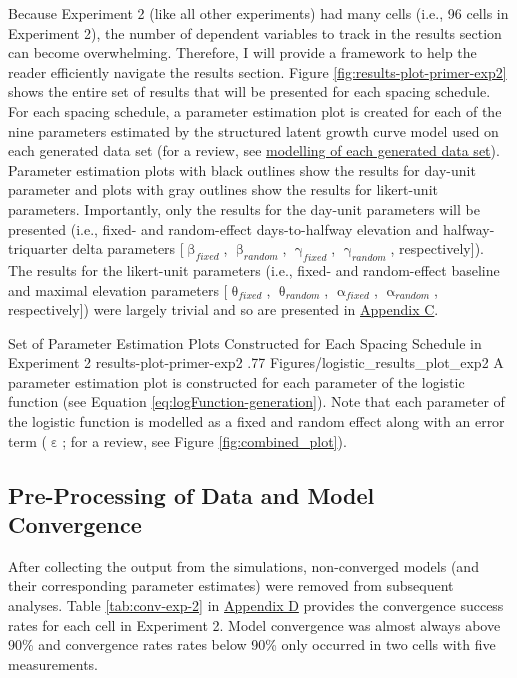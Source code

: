 \documentclass[
12pt, %
twoside,
english]{guelphthesis}
\theoremstyle{definition}
\theoremstyle{definition}
\theoremstyle{definition}
\theoremstyle{definition}
\theoremstyle{remark}
\begin{document}
Because Experiment 2 (like all other experiments) had many cells (i.e., 96 cells in Experiment 2), the number of dependent variables to track in the results section can become overwhelming. Therefore, I will provide a framework to help the reader efficiently navigate the results section. Figure \ref{fig:results-plot-primer-exp2} shows the entire set of results that will be presented for each spacing schedule. For each spacing schedule, a parameter estimation plot is created for each of the nine parameters estimated by the structured latent growth curve model used on each generated data set (for a review, see \protect\hyperlink{modelling-data-sets}{modelling of each generated data set}). Parameter estimation plots with black outlines show the results for day-unit parameter and plots with gray outlines show the results for likert-unit parameters. Importantly, only the results for the day-unit parameters will be presented (i.e., fixed- and random-effect days-to-halfway elevation and halfway-triquarter delta parameters {[}\(\upbeta_{fixed}\), \(\upbeta_{random}\), \(\upgamma_{fixed}\), \(\upgamma_{random}\), respectively{]}). The results for the likert-unit parameters (i.e., fixed- and random-effect baseline and maximal elevation parameters {[}\(\uptheta_{fixed}\), \(\uptheta_{random}\), \(\upalpha_{fixed}\), \(\upalpha_{random}\), respectively{]}) were largely trivial and so are presented in \protect\hyperlink{appendix-c}{Appendix C}.
\begin{apaFigure}
[portrait]
[samepage]
[-0.2cm]
{Set of Parameter Estimation Plots Constructed for Each Spacing Schedule in Experiment 2}
{results-plot-primer-exp2}
{.77}
{Figures/logistic_results_plot_exp2}
{A parameter estimation plot is constructed for each parameter of the logistic function (see Equation \ref{eq:logFunction-generation}). Note that each parameter of the logistic function is modelled as a fixed and random effect along with an error term ($\upepsilon$; for a review, see Figure \ref{fig:combined_plot}).}
\end{apaFigure}
\hypertarget{pre-processing-of-data-and-model-convergence-1}{%
\subsection{Pre-Processing of Data and Model Convergence}\label{pre-processing-of-data-and-model-convergence-1}}

After collecting the output from the simulations, non-converged models
(and their corresponding parameter estimates) were removed from
subsequent analyses. Table \ref{tab:conv-exp-2} in \protect\hyperlink{appendix-d-convergence-rates}{Appendix D} provides the convergence
success rates for each cell in Experiment 2. Model convergence was almost always above 90\% and convergence rates
rates below 90\% only occurred in two cells with five measurements.
\end{document}
